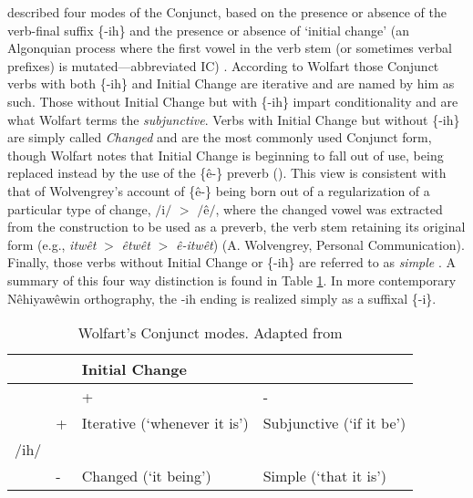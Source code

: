 \citet{Wolfart1973} described four modes of the Conjunct, based on the presence or absence of the verb-final suffix \{-ih\} and the presence or absence of `initial change' (an Algonquian process where the first vowel in the verb stem (or sometimes verbal prefixes) is mutated---abbreviated IC) \citep{Wolfart1973}. According to Wolfart those Conjunct verbs with both \{-ih\} and Initial Change are iterative and are named by him as such. Those without Initial Change but with \{-ih\} impart conditionality and are what Wolfart terms the \textit{subjunctive}. Verbs with Initial Change but without \{-ih\} are simply called \textit{Changed} and are the most commonly used Conjunct form, though Wolfart notes that Initial Change is beginning to fall out of use, being replaced instead by the use of the \{\^{e}-\} preverb (\citeyear{Wolfart1973}). This view is consistent with that of Wolvengrey's account of \{\^{e}-\} being born out of a regularization of a particular type of change, $/$i$/$ $>$ $/$\^{e}$/$, where the changed vowel was extracted from the construction to be used as a preverb, the verb stem retaining its original form (e.g., \textit{itw\^{e}t} $>$ \textit{\^{e}tw\^{e}t} $>$ \textit{\^{e}-itw\^{e}t})  (A. Wolvengrey, Personal Communication).  Finally, those verbs without Initial Change or \{-ih\} are referred to as \textit{simple} \citep{Wolfart1973}. A summary of this four way distinction is found in Table \ref{Conjunctforms}. In more contemporary Nêhiyawêwin orthography, the {-ih} ending is realized simply as a suffixal \{-i\}. 

\begin{table}
\centering
\begin{tabular}{llll} \\
\toprule
     &   & Initial Change                  &                  \\
\midrule
     &   & +                        & -                      \\
     & + & Iterative (`whenever it is') & Subjunctive (`if it be') \\
/ih/ &   &                          &                        \\
     & - & Changed (`it being')       & Simple (`that it is') \\   \bottomrule
\end{tabular}
\caption{Wolfart's Conjunct modes. Adapted from \citet[45]{Wolfart1973}}
\label{Conjunctforms}
\end{table}

